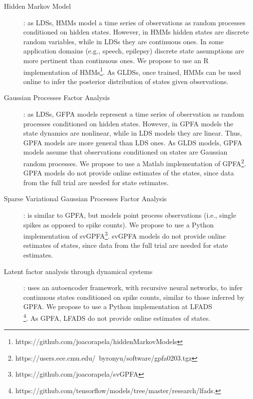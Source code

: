 \begin{description}
    \item[Hidden Markov Model]\citep[HMM;][]{rabiner89}: as LDSs, HMMs model a
        time series of observations as random processes conditioned on hidden
        states. However, in HMMs hidden states are discrete random variables,
        while in LDSs they are continuous ones. In some application domains
        (e.g., speech, epilepsy) discrete state assumptions are more pertinent
        than continuous ones. We propose to use an R implementation of
        HMMs\footnote{https://github.com/joacorapela/hiddenMarkovModels}.
        As GLDSs, once trained, HMMs can be used online to infer the posterior
        distribution of states given observations.

    \item[Gaussian Processes Factor Analysis]\citep[GPFA;][]{yuEtAl09}: as
        LDSs, GFPA models represent a time series of observation as random
        processes conditioned on hidden states. However, in GPFA models the
        state dynamics are nonlinear, while in LDS models they are linear.
        Thus, GPFA models are more general than LDS ones. As GLDS models, GPFA
        models assume that observations conditioned on states are Gaussian
        random processes. We propose to use a Matlab implementation of
        GPFA\footnote{https://users.ece.cmu.edu/~byronyu/software/gpfa0203.tgz}.
        GPFA models do not provide online estimates of the states, since data
        from the full trial are needed for state estimates.

    \item[Sparse Variational Gaussian Processes Factor
        Analysis]\citep[svGPFA;][]{dunckerAndSahani18}: is similar to GPFA, but
        models point process observations (i.e., single spikes as opposed to
        spike counts). We propose to use a Python implementation of
        svGPFA\footnote{https://github.com/joacorapela/svGPFA}.
        svGPFA models do not provide online estimates of states, since data
        from the full trial are needed for state estimates.

    \item[Latent factor analysis through dynamical
        systems]\citep[LFADS;][]{pandarinathEtAl18}: uses an autoencoder
        framework, with recursive neural networks, to infer continuous states
        conditioned on spike counts, similar to those inferred by GPFA. We
        propose to use a Python implementation at
        LFADS\\ \footnote{https://github.com/tensorflow/models/tree/master/research/lfads.}.
        As GPFA, LFADS do not provide online estimates of states.

\end{description}

